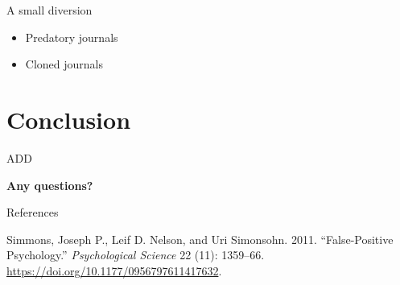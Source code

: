 \documentclass[
  ignorenonframetext,
  aspectratio=169,
]{beamer}
\providecommand{\tightlist}{%
  \setlength{\itemsep}{0pt}\setlength{\parskip}{0pt}}\usepackage{longtable,booktabs,array}
\newlength{\cslhangindent}
\newenvironment{CSLReferences}[2] %
 {\begin{list}{}{%
  \setlength{\itemindent}{0pt}
  \setlength{\leftmargin}{0pt}
  \setlength{\parsep}{0pt}
  \ifodd #1
   \setlength{\leftmargin}{\cslhangindent}
   \setlength{\itemindent}{-1\cslhangindent}
  \fi
  \setlength{\itemsep}{#2\baselineskip}}}
 {\end{list}}
\begin{document}
\begin{frame}{A small diversion}
\label{a-small-diversion}
\begin{itemize}
\tightlist
\item
  Predatory journals
\item
  Cloned journals
\end{itemize}
\end{frame}

\section{Conclusion}\label{conclusion}

\begin{frame}{}
\label{section-2}
ADD
\end{frame}

\begin{frame}{}
\label{section-3}
\textbf{Any questions?}
\end{frame}

\begin{frame}{References}
\label{references}
\label{refs}
\begin{CSLReferences}{1}{0}
Simmons, Joseph P., Leif D. Nelson, and Uri Simonsohn. 2011.
{``False-Positive Psychology.''} \emph{Psychological Science} 22 (11):
1359--66. \url{https://doi.org/10.1177/0956797611417632}.

\end{CSLReferences}
\end{frame}
\end{document}
